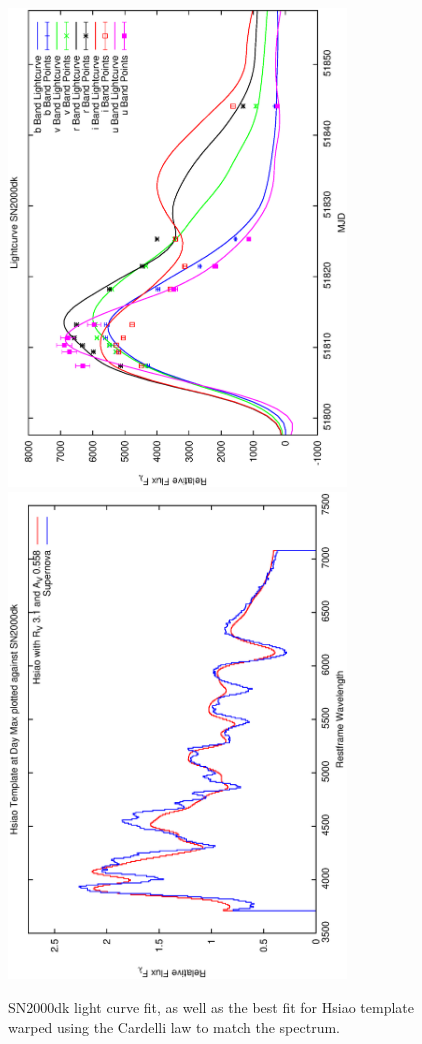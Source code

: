 \clearpage

\begin{figure}[p]
\centering
\includegraphics[angle=-90,width=0.8\textwidth]{./figures/ltcv/SN2000dk_v027_lightcurve.ps}
\hfill
\includegraphics[angle=-90,width=0.8\textwidth]{./figures/hsiao/SN2000dk_v001_hsiao.ps}
\hfill
\caption{SN2000dk light curve fit, as well as the best fit for Hsiao template warped using the Cardelli law to match the spectrum.}
\label{fig:SN2000dkfour2}
\end{figure}

